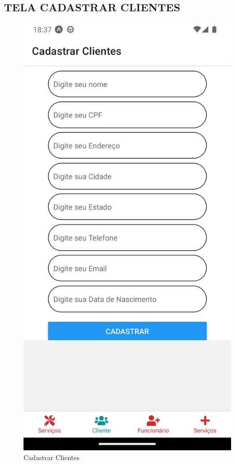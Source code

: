 \subsection{TELA CADASTRAR CLIENTES}
\begin{figure}[htb]
	\caption{\label{fig_diagrama-classes} Cadastrar Clientes}
	\begin{center}
	    \includegraphics[width=0.5\linewidth]{imagens/tela-cadastrar-cliente.png}
	\end{center}
\end{figure}

\newpage

